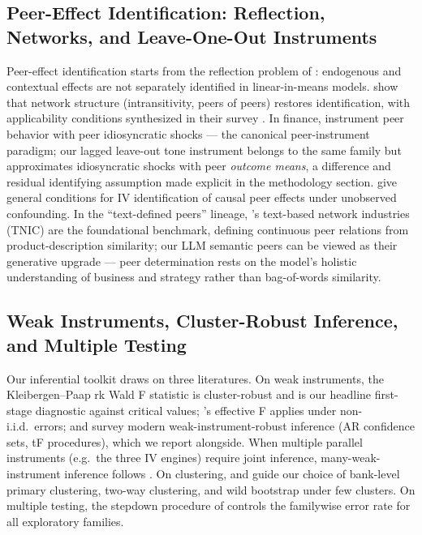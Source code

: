 \subsection{Peer-Effect Identification: Reflection, Networks, and Leave-One-Out Instruments}
Peer-effect identification starts from the reflection problem of
\textcite{manski1993reflection}: endogenous and contextual effects are not separately
identified in linear-in-means models. \textcite{bramoulle2009networks} show that network
structure (intransitivity, peers of peers) restores identification, with applicability
conditions synthesized in their survey \parencite{bramoulle2020survey}. In finance,
\textcite{leary2014peerfirms} instrument peer behavior with peer idiosyncratic shocks --- the
canonical peer-instrument paradigm; our lagged leave-out tone instrument belongs to the same
family but approximates idiosyncratic shocks with peer \emph{outcome means}, a difference and
residual identifying assumption made explicit in the methodology section. \textcite{luo2025causalpeer} give general conditions for IV identification of
causal peer effects under unobserved confounding. In the ``text-defined peers'' lineage,
\textcite{hoberg2016textnetwork}'s text-based network industries (TNIC) are the foundational
benchmark, defining continuous peer relations from product-description similarity; our LLM
semantic peers can be viewed as their generative upgrade --- peer determination rests on the
model's holistic understanding of business and strategy rather than bag-of-words similarity.

\subsection{Weak Instruments, Cluster-Robust Inference, and Multiple Testing}
Our inferential toolkit draws on three literatures. On weak instruments, the
Kleibergen--Paap rk Wald F statistic \parencite{kleibergen2006rank} is cluster-robust and is
our headline first-stage diagnostic against \textcite{stock2005weak} critical values;
\textcite{montielolea2013weak}'s effective F applies under non-i.i.d.\ errors; and
\textcite{andrews2019weakiv} survey modern weak-instrument-robust inference (AR confidence
sets, tF procedures), which we report alongside. When multiple parallel instruments (e.g.\
the three IV engines) require joint inference, many-weak-instrument inference follows
\textcite{mikusheva2022manyweak}. On clustering, \textcite{mackinnon2023cluster} and
\textcite{cameron2015practitioner} guide our choice of bank-level primary clustering, two-way
clustering, and wild bootstrap under few clusters. On multiple testing, the stepdown procedure
of \textcite{romano2005stepdown} controls the familywise error rate for all exploratory
families.

